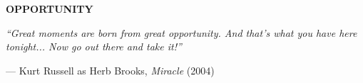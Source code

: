 \begin{titlepage}
    \thispagestyle{empty}
    
    
    \mbox{}
    
\end{titlepage}

\clearpage

\begin{center}
    \vspace*{3cm}
    
    {\fontsize{48}{60}\selectfont \textbf{\textcolor{teamprimary}{OPPORTUNITY}}} \\[0.5cm]
    
    
    \vspace{2cm}
    
    \begin{minipage}{0.8\textwidth}
        \centering
        \fontsize{18}{26}\selectfont
        \textcolor{teamprimary!90}{
            \textit{``Great moments are born from great opportunity. And that's what you have here tonight... Now go out there and take it!''}
        }
        
        \vspace{0.8cm}
        
        {\large \textcolor{teamprimary!70}{— Kurt Russell as Herb Brooks, \textit{Miracle} (2004)}}
    \end{minipage}
\end{center}

